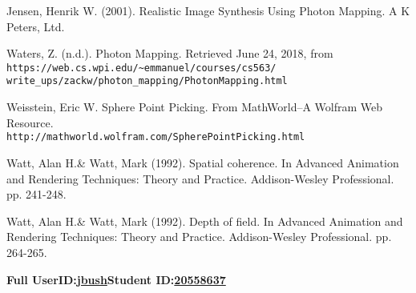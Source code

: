 \documentclass {article}
\begin{document}
\begin{description}
\begin{thebibliography}{15}
Jensen, Henrik W. (2001). Realistic Image Synthesis Using Photon Mapping. A K Peters, Ltd.

Waters, Z. (n.d.). Photon Mapping. Retrieved June 24, 2018, from\\ \texttt{https://web.cs.wpi.edu/\textasciitilde emmanuel/courses/cs563/\\write\_ups/zackw/photon\_mapping/PhotonMapping.html}

Weisstein, Eric W. Sphere Point Picking. From MathWorld--A Wolfram Web Resource.\\ \texttt{http://mathworld.wolfram.com/SpherePointPicking.html}


Watt, Alan H.\& Watt, Mark (1992). Spatial coherence. In Advanced Animation and Rendering Techniques: Theory and Practice. Addison-Wesley Professional. pp. 241-248.

Watt, Alan H.\& Watt, Mark (1992). Depth of field. In Advanced Animation and Rendering Techniques: Theory and Practice. Addison-Wesley Professional. pp. 264-265.




\end{thebibliography}
\endgroup

\end{description}
\newpage



{\hfill{\bf Full UserID:\hspace{0.2in}\underline{\hspace{0.5in}jbush\hspace{0.5in}}}\hfill{\bf Student ID:\hspace{0.2in}\underline{\hspace{0.4in}20558637\hspace{0.4in}}}\hfill}
\end{document}
